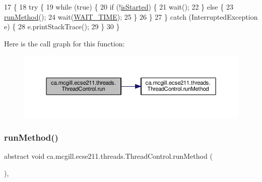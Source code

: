 \begin{DoxyCode}
17                                  \{
18     \textcolor{keywordflow}{try} \{
19       \textcolor{keywordflow}{while} (\textcolor{keyword}{true}) \{
20         \textcolor{keywordflow}{if} (!\hyperlink{classca_1_1mcgill_1_1ecse211_1_1threads_1_1_thread_control_a92f4933511db42476e39956246bcf2fe}{isStarted}) \{
21           wait();
22         \} \textcolor{keywordflow}{else} \{
23           \hyperlink{classca_1_1mcgill_1_1ecse211_1_1threads_1_1_thread_control_a2959c54bdb6c62c9d5569cdf3ccf2418}{runMethod}();
24           wait(\hyperlink{classca_1_1mcgill_1_1ecse211_1_1threads_1_1_thread_control_a395cfe1d73b3ef14da0830ed0a499f82}{WAIT\_TIME});
25         \}
26       \}
27     \} \textcolor{keywordflow}{catch} (InterruptedException e) \{
28       e.printStackTrace();
29     \}
30   \}
\end{DoxyCode}
Here is the call graph for this function\+:\nopagebreak
\begin{figure}[H]
\begin{center}
\leavevmode
\includegraphics[width=350pt]{classca_1_1mcgill_1_1ecse211_1_1threads_1_1_thread_control_a03e743000ea2c37080427565e8ec5f35_cgraph}
\end{center}
\end{figure}
\mbox{\label{classca_1_1mcgill_1_1ecse211_1_1threads_1_1_thread_control_a2959c54bdb6c62c9d5569cdf3ccf2418}} 
\subsubsection{\texorpdfstring{run\+Method()}{runMethod()}}
{\footnotesize\ttfamily abstract void ca.\+mcgill.\+ecse211.\+threads.\+Thread\+Control.\+run\+Method (\begin{DoxyParamCaption}{ }\end{DoxyParamCaption})\hspace{0.3cm}{\ttfamily [abstract]}, {\ttfamily [protected]}}

